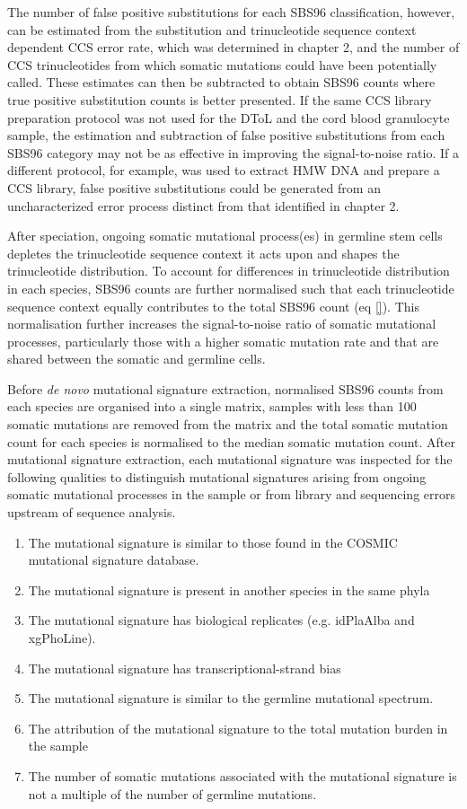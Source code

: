 The number of false positive substitutions for each SBS96 classification, however, can be estimated from the substitution and trinucleotide sequence context dependent CCS error rate, which was determined in chapter 2, and the number of CCS trinucleotides from which somatic mutations could have been potentially called. These estimates can then be subtracted to obtain SBS96 counts where true positive substitution counts is better presented. If the same CCS library preparation protocol was not used for the DToL and the cord blood granulocyte sample, the estimation and subtraction of false positive substitutions from each SBS96 category may not be as effective in improving the signal-to-noise ratio. If a different protocol, for example, was used to extract HMW DNA and prepare a CCS library, false positive substitutions could be generated from an uncharacterized error process distinct from that identified in chapter 2.

After speciation, ongoing somatic mutational process(es) in germline stem cells depletes the trinucleotide sequence context it acts upon and shapes the trinucleotide distribution. To account for differences in trinucleotide distribution in each species, SBS96 counts are further normalised such that each trinucleotide sequence context equally contributes to the total SBS96 count (eq \ref{}). This normalisation further increases the signal-to-noise ratio of somatic mutational processes, particularly those with a higher somatic mutation rate and that are shared between the somatic and germline cells. 

Before \textit{de novo} mutational signature extraction, normalised SBS96 counts from each species are organised into a single matrix, samples with less than 100 somatic mutations are removed from the matrix and the total somatic mutation count for each species is normalised to the median somatic mutation count. After mutational signature extraction, each mutational signature was inspected for the following qualities to distinguish mutational signatures arising from ongoing somatic mutational processes in the sample or from library and sequencing errors upstream of sequence analysis. 

\begin{enumerate}
\item The mutational signature is similar to those found in the COSMIC mutational signature database.
\item The mutational signature is present in another species in the same phyla 
\item The mutational signature has biological replicates (e.g. idPlaAlba and xgPhoLine).
\item The mutational signature has transcriptional-strand bias
\item The mutational signature is similar to the germline mutational spectrum.
\item The attribution of the mutational signature to the total mutation burden in the sample 
\item The number of somatic mutations associated with the mutational signature is not a multiple of the number of germline mutations. 
\end{enumerate}

